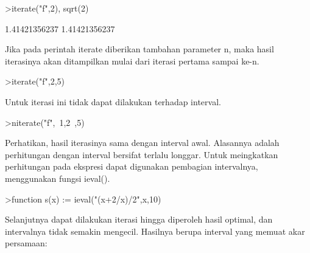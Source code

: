 \documentclass[a4paper,10pt]{article}
\begin{document}
\begin{eulernotebook}
\begin{eulercomment}
\begin{eulercomment}
\begin{eulercomment}
\begin{eulercomment}
\begin{eulercomment}
\begin{eulercomment}
\begin{eulercomment}
\begin{eulercomment}
\begin{eulercomment}
\begin{eulercomment}
\begin{eulercomment}
\begin{eulercomment}
\begin{eulercomment}
\begin{eulercomment}
\begin{eulercomment}
\begin{eulercomment}
\begin{eulercomment}
\begin{eulercomment}
\begin{eulerprompt}
>iterate("f",2), sqrt(2)
\end{eulerprompt}
\begin{euleroutput}
  1.41421356237
  1.41421356237
\end{euleroutput}
\begin{eulercomment}
Jika pada perintah iterate diberikan tambahan parameter n, maka hasil iterasinya akan
ditampilkan mulai dari iterasi pertama sampai ke-n.
\end{eulercomment}
\begin{eulerprompt}
>iterate("f",2,5)
\end{eulerprompt}
\begin{euleroutput}
  [2,  1.5,  1.41667,  1.41422,  1.41421,  1.41421]
\end{euleroutput}
\begin{eulercomment}
Untuk iterasi ini tidak dapat dilakukan terhadap interval.
\end{eulercomment}
\begin{eulerprompt}
>niterate("f",~1,2~,5)
\end{eulerprompt}
\begin{euleroutput}
  [ ~1,2~,  ~1,2~,  ~1,2~,  ~1,2~,  ~1,2~,  ~1,2~ ]
\end{euleroutput}
\begin{eulercomment}
Perhatikan, hasil iterasinya sama dengan interval awal. Alasannya adalah perhitungan dengan
interval bersifat terlalu longgar. Untuk meingkatkan perhitungan pada ekspresi dapat
digunakan pembagian intervalnya, menggunakan fungsi ieval().
\end{eulercomment}
\begin{eulerprompt}
>function s(x) := ieval("(x+2/x)/2",x,10)
\end{eulerprompt}
\begin{eulercomment}
Selanjutnya dapat dilakukan iterasi hingga diperoleh hasil optimal, dan intervalnya tidak
semakin mengecil. Hasilnya berupa interval yang memuat akar persamaan:


\end{eulercomment}
\end{eulercomment}
\end{eulercomment}
\end{eulercomment}
\end{eulercomment}
\end{eulercomment}
\end{eulercomment}
\end{eulercomment}
\end{eulercomment}
\end{eulercomment}
\end{eulercomment}
\end{eulercomment}
\end{eulercomment}
\end{eulercomment}
\end{eulercomment}
\end{eulercomment}
\end{eulercomment}
\end{eulercomment}
\end{eulercomment}
\end{eulernotebook}
\end{document}
